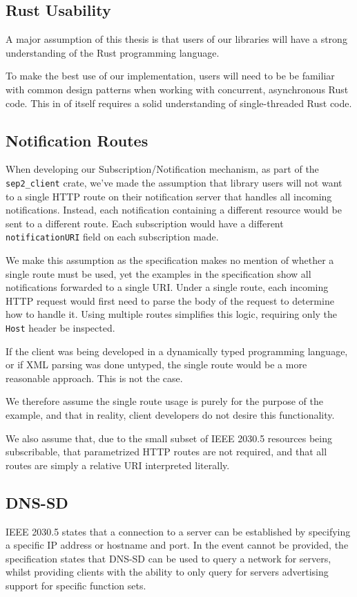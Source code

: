 \subsection{Rust Usability}
A major assumption of this thesis is that users of our libraries will have a strong understanding of the Rust programming language.

To make the best use of our implementation, users will need to be be familiar with common design patterns when working with concurrent, asynchronous Rust code. This in of itself requires a solid understanding of single-threaded Rust code.

\subsection{Notification Routes}
When developing our Subscription/Notification mechanism, as part of the \texttt{sep2\_client} crate, we've made the assumption that library users will not want to a single HTTP route on their notification server that handles all incoming notifications. Instead, each notification containing a different resource would be sent to a different route. Each subscription would have a different \texttt{notificationURI} field on each subscription made.

We make this assumption as the specification makes no mention of whether a single route must be used, yet the examples in the specification show all notifications forwarded to a single URI. Under a single route, each incoming HTTP request would first need to parse the body of the request to determine how to handle it. Using multiple routes simplifies this logic, requiring only the \texttt{Host} header be inspected. 

If the client was being developed in a dynamically typed programming language, or if XML parsing was done untyped, the single route would be a more reasonable approach. This is not the case.

We therefore assume the single route usage is purely for the purpose of the example, and that in reality, client developers do not desire this functionality.

We also assume that, due to the small subset of IEEE 2030.5 resources being subscribable, that parametrized HTTP routes are not required, and that all routes are simply a relative URI interpreted literally.

\subsection{DNS-SD}
IEEE 2030.5 states that a connection to a server can be established by specifying a specific IP address or hostname and port. In the event cannot be provided, the specification states that DNS-SD can be used to query a network for servers, whilst providing clients with the ability to only query for servers advertising support for specific function sets. 

